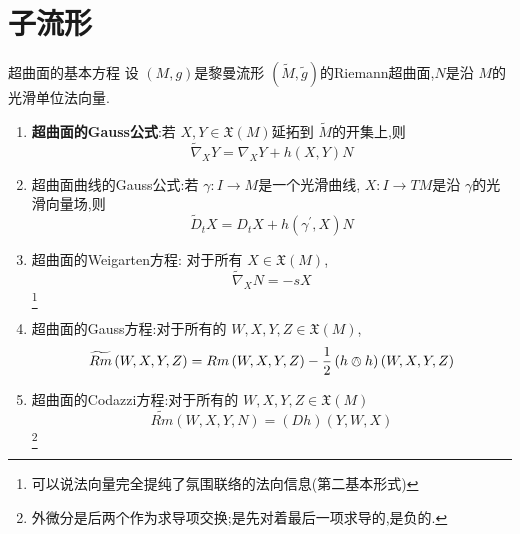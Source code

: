 \documentclass[../../main.tex]{subfiles}
\begin{document}
\chapter{ 子流形 }


\begin{theorem}{超曲面的基本方程}
    设 \(  \left( M,g \right)   \)是黎曼流形 \(  \left( \tilde{M},\tilde{g} \right)   \)的Riemann超曲面,\(  N  \)是沿 \(  M  \)的光滑单位法向量. 
    \begin{enumerate}
        \item \textbf{超曲面的Gauss公式}:若 \(  X,Y \in \mathfrak{X}\left( M \right)   \)延拓到 \(  \tilde{M}  \)的开集上,则 \[
         \tilde{\nabla} _{X}Y=  \nabla _{X}Y+ h\left( X,Y \right)N 
        \]  
        \item 超曲面曲线的Gauss公式:若 \(   \gamma :I\to M  \)是一个光滑曲线, \(  X:I\to TM  \)是沿 \(   \gamma   \)的光滑向量场,则 \[
        \tilde{D}_{t}X= D_{t}X+ h\left(  \gamma ^{\prime} ,X \right)N 
        \]
        \item 超曲面的Weigarten方程: 对于所有 \(  X \in \mathfrak{X}\left( M \right)   \), \[
         \tilde{\nabla} _{X}N= -sX
        \]    \footnote{可以说法向量完全提纯了氛围联络的法向信息(第二基本形式)}
        \item 超曲面的Gauss方程:对于所有的 \(  W,X,Y,Z \in \mathfrak{X}\left( M \right)   \), \[
        \widetilde{Rm}\left( W,X,Y,Z \right)= Rm\left( W,X,Y,Z \right)-\frac{1}{2} \left( h \owedge h \right)\left( W,X,Y,Z \right)    
        \] 
        \item 超曲面的Codazzi方程:对于所有的 \(  W,X,Y,Z \in \mathfrak{X}\left( M \right)   \) \[
        \widetilde{Rm}\left( W,X,Y,N \right)= \left( Dh \right)\left( Y,W,X \right)   
        \] \footnote{外微分是后两个作为求导项交换;是先对着最后一项求导的,是负的.}
    \end{enumerate}
    
\end{theorem}
\end{document}
